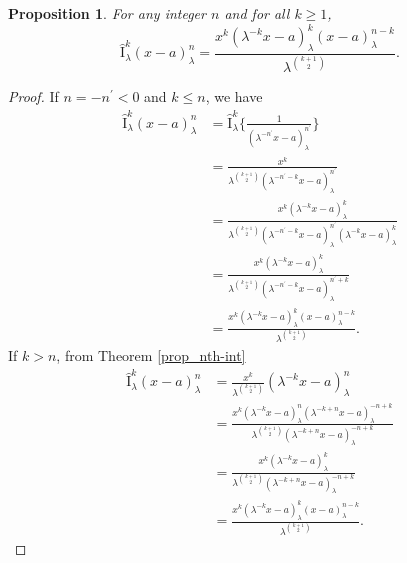 \documentclass[12pt]{article}
\newcommand{\I}{\widehat{\mathrm{I}}}
\newtheorem{proposition}{Proposition}
\begin{document}
\begin{proposition}\label{prop_intk_binom}
For any integer $n$ and for all $k\geq1$,
    \begin{equation}
        \I_{\lambda}^k(x-a)_{\lambda}^n=\frac{x^k(\lambda^{-k}x-a)_{\lambda}^{k}(x-a)_{\lambda}^{n-k}}{\lambda^{\binom{k+1}{2}}}.
    \end{equation}
\end{proposition}
\begin{proof}
If $n=-n^\prime<0$ and $k\leq n$, we have
    \begin{align*}
        \I_{\lambda}^k(x-a)_{\lambda}^{n}&=\I_{\lambda}^k\bigg\{\frac{1}{(\lambda^{-n^\prime}x-a)_{\lambda}^{n^\prime}}\bigg\}\\
        &=\frac{x^k}{\lambda^{\binom{k+1}{2}}(\lambda^{-n^\prime-k}x-a)_{\lambda}^{n^\prime}}\\
        &=\frac{x^k(\lambda^{-k}x-a)_{\lambda}^k}{\lambda^{\binom{k+1}{2}}(\lambda^{-n^\prime-k}x-a)_{\lambda}^{n^\prime}(\lambda^{-k}x-a)_{\lambda}^k}\\
        &=\frac{x^k(\lambda^{-k}x-a)_{\lambda}^{k}}{\lambda^{\binom{k+1}{2}}(\lambda^{-n^\prime-k}x-a)_{\lambda}^{n^\prime+k}}\\
        &=\frac{x^k(\lambda^{-k}x-a)_{\lambda}^{k}(x-a)_{\lambda}^{n-k}}{\lambda^{\binom{k+1}{2}}}.
    \end{align*}
If $k>n$, from Theorem \ref{prop_nth-int}
\begin{align*}
    \I_{\lambda}^k(x-a)_{\lambda}^n&=\frac{x^k}{\lambda^{\binom{k+1}{2}}}(\lambda^{-k}x-a)_{\lambda}^n\\
    &=\frac{x^{k}(\lambda^{-k}x-a)_{\lambda}^n(\lambda^{-k+n}x-a)_{\lambda}^{-n+k}}{\lambda^{\binom{k+1}{2}}(\lambda^{-k+n}x-a)_{\lambda}^{-n+k}}\\
    &=\frac{x^{k}(\lambda^{-k}x-a)_{\lambda}^k}{\lambda^{\binom{k+1}{2}}(\lambda^{-k+n}x-a)_{\lambda}^{-n+k}}\\
    &=\frac{x^{k}(\lambda^{-k}x-a)_{\lambda}^k(x-a)_{\lambda}^{n-k}}{\lambda^{\binom{k+1}{2}}}.
\end{align*}
\end{proof}
\end{document}
